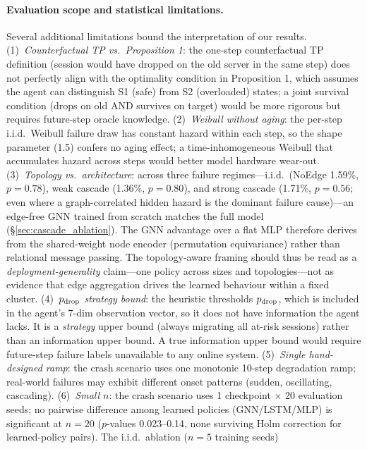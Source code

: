 \documentclass[review,1p]{elsarticle}
\theoremstyle{definition}
\begin{document}
\paragraph{Evaluation scope and statistical limitations.}
Several additional limitations bound the interpretation of our results.
(1)~\textit{Counterfactual TP vs.\ Proposition 1}: the one-step counterfactual
TP definition (session would have dropped on the old server in the same step)
does not perfectly align with the optimality condition in Proposition 1,
which assumes the agent can distinguish S1 (safe) from S2 (overloaded) states;
a joint survival condition (drops on old AND survives on target) would be
more rigorous but requires future-step oracle knowledge.
(2)~\textit{Weibull without aging}: the per-step i.i.d.\ Weibull failure
draw has constant hazard within each step, so the shape parameter
(1.5) confers no aging effect; a time-inhomogeneous Weibull that
accumulates hazard across steps would better model hardware wear-out.
(3)~\textit{Topology vs.\ architecture}: across three failure
regimes---i.i.d.\ (NoEdge 1.59\%, $p{=}0.78$), weak cascade
(1.36\%, $p{=}0.80$), and strong cascade (1.71\%, $p{=}0.56$;
even where a graph-correlated hidden hazard is the dominant failure
cause)---an edge-free GNN trained from scratch matches the full
model (\S\ref{sec:cascade_ablation}).  The GNN advantage over a flat
MLP therefore derives from the shared-weight node encoder
(permutation equivariance) rather than relational message passing.
The topology-aware framing should thus be read as a
\emph{deployment-generality} claim---one policy across sizes and
topologies---not as evidence that edge aggregation drives the
learned behaviour within a fixed cluster.
(4)~\textit{$p_{\rm drop}$ strategy bound}: the heuristic thresholds $p_{\rm drop}$,
which is included in the agent's 7-dim observation vector, so it
does not have information the agent lacks.  It is a \emph{strategy}
upper bound (always migrating all at-risk sessions) rather than an
information upper bound.  A true information upper bound would require
future-step failure labels unavailable to any online system.
(5)~\textit{Single hand-designed ramp}: the crash scenario uses one
monotonic 10-step degradation ramp; real-world failures may exhibit
different onset patterns (sudden, oscillating, cascading).
(6)~\textit{Small $n$}: the crash scenario uses 1 checkpoint $\times$ 20 evaluation
seeds; no pairwise difference among learned policies (GNN/LSTM/MLP) is significant
at $n{=}20$ ($p$-values 0.023--0.14, none surviving Holm correction for learned-policy pairs).  The i.i.d.\ ablation ($n{=}5$ training seeds)
\end{document}
